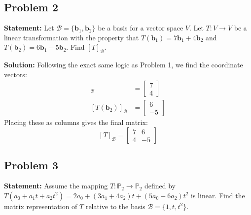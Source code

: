 \documentclass[11pt, a4paper]{article}
\theoremstyle{definition}
\theoremstyle{remark}
\begin{document}
\subsection{Problem 2}
\textbf{Statement:} Let $\mathcal{B} = \{\mathbf{b}_1, \mathbf{b}_2\}$ be a basis for a vector space $V$. Let $T: V \to V$ be a linear transformation with the property that $T(\mathbf{b}_1) = 7\mathbf{b}_1 + 4\mathbf{b}_2$ and $T(\mathbf{b}_2) = 6\mathbf{b}_1 - 5\mathbf{b}_2$. Find $[T]_\mathcal{B}$.

\textbf{Solution:}
Following the exact same logic as Problem 1, we find the coordinate vectors:
\begin{align*}
    [T(\mathbf{b}_1)]_\mathcal{B} &= \begin{bmatrix} 7 \\ 4 \end{bmatrix} \\
    [T(\mathbf{b}_2)]_\mathcal{B} &= \begin{bmatrix} 6 \\ -5 \end{bmatrix}
\end{align*}
Placing these as columns gives the final matrix:
\[
[T]_\mathcal{B} = \begin{bmatrix} 7 & 6 \\ 4 & -5 \end{bmatrix}
\]

\subsection{Problem 3}
\textbf{Statement:} Assume the mapping $T: \mathbb{P}_2 \to \mathbb{P}_2$ defined by $T(a_0 + a_1t + a_2t^2) = 2a_0 + (3a_1 + 4a_2)t + (5a_0 - 6a_2)t^2$ is linear. Find the matrix representation of $T$ relative to the basis $\mathcal{B} = \{1, t, t^2\}$.
\end{document}
